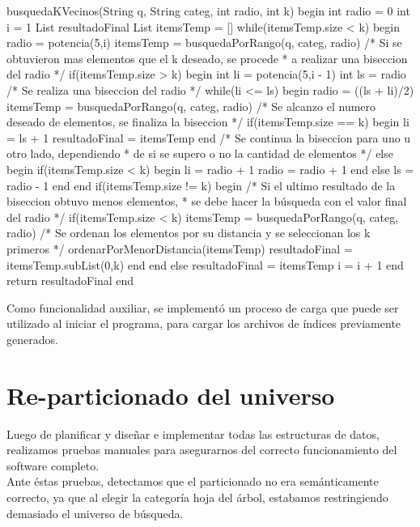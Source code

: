\begin{algorithm}[caption={B\'usqueda de los k-vecinos}, label={alg5}]
busquedaKVecinos(String q, String categ, int radio, int k)
begin
 int radio = 0
 int i = 1
 List resultadoFinal
 List itemsTemp = []
 while(itemsTemp.size < k)
 begin
  radio = potencia(5,i)
  itemsTemp = busquedaPorRango(q, categ, radio)
  /* Si se obtuvieron mas elementos que el k deseado, se procede 
   * a realizar una biseccion del radio */
  if(itemsTemp.size > k)
  begin
   int li = potencia(5,i - 1)
   int ls = radio
   /* Se realiza una biseccion del radio */
   while(li <= ls)
   begin
    radio = ((ls + li)/2)
    itemsTemp = busquedaPorRango(q, categ, radio)
    /* Se alcanzo el numero deseado de elementos, se finaliza la biseccion */
    if(itemsTemp.size == k)
    begin
     li = ls + 1
     resultadoFinal = itemsTemp
    end
    /* Se continua la biseccion para uno u otro lado, dependiendo 
     * de si se supero o no la cantidad de elementos */
    else
    begin
     if(itemsTemp.size < k)
     begin
      li = radio + 1
      radio = radio + 1
     end
     else
      ls = radio - 1
    end
   end
   if(itemsTemp.size != k)
   begin
    /* Si el ultimo resultado de la biseccion obtuvo menos elementos,
     * se debe hacer la b\'usqueda con el valor final del radio */
    if(itemsTemp.size < k)
     itemsTemp = busquedaPorRango(q, categ, radio)
    /* Se ordenan los elementos por su distancia y se seleccionan los k primeros */
    ordenarPorMenorDistancia(itemsTemp)
    resultadoFinal = itemsTemp.subList(0,k)
   end
  end
  else
   resultadoFinal = itemsTemp
  i = i + 1 
 end
 return resultadoFinal
end
\end{algorithm}

Como funcionalidad auxiliar, se implement\'o un proceso de carga que puede ser utilizado al iniciar el programa, para cargar los archivos de \'indices previamente generados.\\


\section{Re-particionado del universo}

Luego de planificar y diseñar e implementar todas las estructuras de datos, realizamos pruebas manuales para asegurarnos del correcto funcionamiento del software completo.\\

Ante \'estas pruebas, detectamos que el particionado no era sem\'anticamente correcto, ya que al elegir la categor\'ia hoja del \'arbol, estabamos restringiendo demasiado el universo de b\'usqueda.\\

